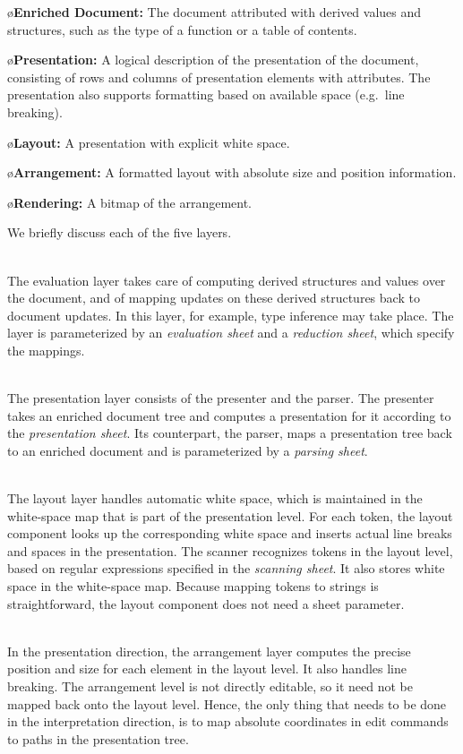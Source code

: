 \documentclass[10pt]{article}
\begin{document}
\o {\bf Enriched Document:} The document attributed with derived values and structures, such as the type of a function or a table of contents.

\o{\bf Presentation:} A logical description of the presentation of the document, consisting of rows and columns of presentation elements with attributes. The presentation also supports formatting based on available space (e.g.\ line breaking).

\o{\bf Layout:} A presentation with explicit white space. 

\o{\bf Arrangement:} A formatted layout with absolute size and position information.

\o{\bf Rendering:} A bitmap of the arrangement.
\el


\bc
We briefly discuss each of the five layers.

\\
The evaluation layer takes care of computing derived structures and values over the document, and of mapping updates on these derived structures back to document updates. In this layer, for example, type inference may take place. The layer is parameterized by an {\em evaluation sheet} and a {\em reduction sheet}, which specify the mappings. 

\\
The presentation layer consists of the presenter and the parser. The presenter takes an enriched document tree and computes a presentation for it according to the {\em presentation sheet}. Its counterpart, the parser, maps a presentation tree back to an enriched document and is parameterized by a {\em parsing sheet}.

\\
The layout layer handles automatic white space, which is maintained in the white-space map that is part of the presentation level. For each token, the layout component looks up the corresponding white space and inserts actual line breaks and spaces in the presentation. The scanner recognizes tokens in the layout level, based on regular expressions specified in the {\em scanning sheet}. It also stores white space in the white-space map. Because mapping tokens to strings is straightforward, the layout component does not need a sheet parameter.

\\
In the presentation direction, the arrangement layer computes the precise position and size for each element in the layout level. It also handles line breaking. The arrangement level is not directly editable, so it need not be mapped back onto the layout level. Hence, the only thing that needs to be done in the interpretation direction, is to map absolute coordinates in edit commands to paths in the presentation tree. 
\end{document}
